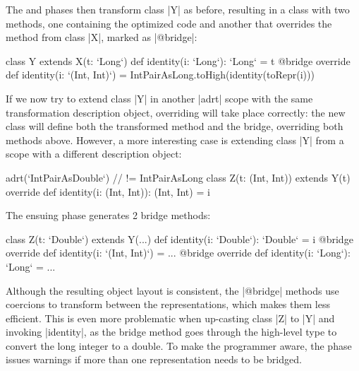 The \coerce{} and \commit{} phases then transform class |Y| as before, resulting in a class with two methods, one containing the optimized code and another that overrides the method from class |X|, marked as |@bridge|:

\begin{lstlisting-nobreak}
class Y extends X(t: `Long`) {
  def identity(i: `Long`): `Long` = t
  @bridge override def identity(i: `(Int, Int)`) =
    IntPairAsLong.toHigh(identity(toRepr(i)))
}
\end{lstlisting-nobreak}

If we now try to extend class |Y| in another |adrt| scope with the same transformation description object, overriding will take place correctly: the new class will define both the transformed method and the bridge, overriding both methods above. However, a more interesting case is extending class |Y| from a scope with a different description object:

\begin{lstlisting-nobreak}
adrt(`IntPairAsDouble`) { // != IntPairAsLong
  class Z(t: (Int, Int)) extends Y(t) {
    override def identity(i: (Int, Int)): (Int, Int) = i
  }
}
\end{lstlisting-nobreak}

The ensuing \bridge{} phase generates 2 bridge methods: %

\begin{lstlisting-nobreak}
class Z(t: `Double`) extends Y(...) {
  def identity(i: `Double`): `Double` = i
  @bridge override def identity(i: `(Int, Int)`) = ...
  @bridge override def identity(i: `Long`): `Long` = ...
}
\end{lstlisting-nobreak}


Although the resulting object layout is consistent, the |@bridge| methods use coercions to transform between the representations, which makes them less efficient. This is even more problematic when up-casting class |Z| to |Y| and invoking |identity|, as the bridge method goes through the high-level type to convert the long integer to a double. To make the programmer aware, the \bridge{} phase issues warnings if more than one representation needs to be bridged.

